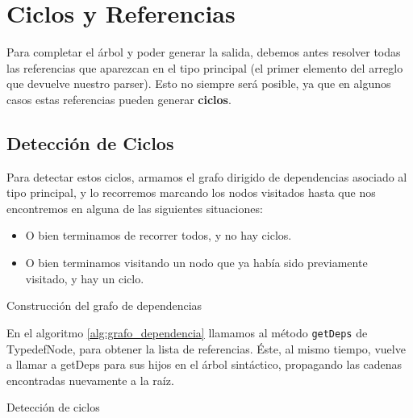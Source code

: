 \hypertarget{sec:referencias}{\section{Ciclos y Referencias}}


    Para completar el árbol y poder generar la salida, debemos antes resolver todas las referencias que aparezcan en el tipo principal (el primer elemento del arreglo que devuelve nuestro parser). Esto no siempre será posible, ya que en algunos casos estas referencias pueden generar \textbf{ciclos}.

\subsection{Detección de Ciclos}

    Para detectar estos ciclos, armamos el grafo dirigido de dependencias asociado al tipo principal, y lo recorremos marcando los nodos visitados hasta que nos encontremos en alguna de las siguientes situaciones:
\begin{itemize}
    \item O bien terminamos de recorrer todos, y no hay ciclos.
    \item O bien terminamos visitando un nodo que ya había sido previamente visitado, y hay un ciclo.
\end{itemize}

\begin{algorithm}[H]
\begin{algorithmic}
    \EndFor
\EndFunction
\end{algorithmic}
\caption{Construcción del grafo de dependencias}
\label{alg:grafo_dependencia}
\end{algorithm}

    En el algoritmo \ref{alg:grafo_dependencia} llamamos al método \texttt{getDeps} de TypedefNode, para obtener la lista de referencias. Éste, al mismo tiempo, vuelve a llamar a getDeps para sus hijos en el árbol sintáctico, propagando las cadenas encontradas nuevamente a la raíz.

\begin{algorithm}[H]
\begin{algorithmic}
        \EndIf

        \EndIf
    \EndFor
\EndFunction
\end{algorithmic}
\caption{Detección de ciclos}
\label{alg:obtener_ciclo}
\end{algorithm}

